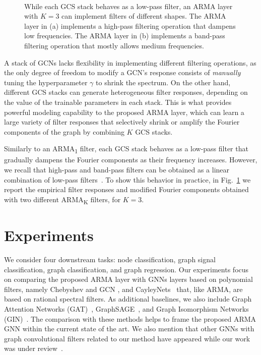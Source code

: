 \documentclass{article}
\begin{document}
\begin{figure}[!t]
	\centering
	~
	
    \caption{\footnotesize While each GCS stack behaves as a low-pass filter, an ARMA layer with $K=3$ can implement filters of different shapes. 
    The ARMA layer in (a) implements a high-pass filtering operation that dampens low frequencies. 
    The ARMA layer in (b) implements a band-pass filtering operation that mostly allows medium frequencies.}
	\label{fig:filters2}
\end{figure}

A stack of GCNs lacks flexibility in implementing different filtering operations, as the only degree of freedom to modify a GCN's response consists of \textit{manually} tuning the hyperparameter $\gamma$ to shrink the spectrum.
On the other hand, different GCS stacks can generate heterogeneous filter responses, depending on the value of the trainable parameters in each stack.
This is what provides powerful modeling capability to the proposed ARMA layer, which can learn a large variety of filter responses that selectively shrink or amplify the Fourier components of the graph by combining $K$ GCS stacks. 

Similarly to an ARMA\textsubscript{1} filter, each GCS stack behaves as a low-pass filter that gradually dampens the Fourier components as their frequency increases.
However, we recall that high-pass and band-pass filters can be obtained as a linear combination of low-pass filters~\cite{oppenheim2001discrete}.
To show this behavior in practice, in Fig.~\ref{fig:filters2} we report the empirical filter responses and modified Fourier components obtained with two different ARMA\textsubscript{K} filters, for $K=3$.


\section{Experiments}
\label{sec:experiments}

We consider four downstream tasks: node classification, graph signal classification, graph classification, and graph regression.
Our experiments focus on comparing the proposed ARMA layer with GNNs layers based on polynomial filters, namely Chebyshev \cite{defferrard2016convolutional} and GCN \cite{kipf2016semi}, and CayleyNets~\cite{levie2017cayleynets} that, like ARMA, are based on rational spectral filters.
As additional baselines, we also include Graph Attention Networks (GAT)~\cite{velickovic2017graph}, GraphSAGE~\cite{hamilton2017inductive}, and Graph Isomorphism Networks (GIN)~\cite{xu2018powerful}.
The comparison with these methods helps to frame the proposed ARMA GNN within the current state of the art.
We also mention that other GNNs with graph convolutional filters related to our method have appeared while our work was under review~\cite{Ioannidis2020Pruned, NIPS2019_9016, zou2020graph, gao2019geometric}.
\end{document}
